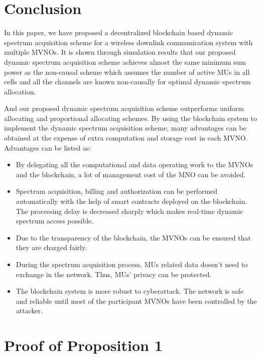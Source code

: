 \documentclass[journal]{IEEEtran}
\begin{document}
\section{Conclusion}
In this paper, we have proposed a decentralized blockchain based dynamic spectrum acquisition scheme for a wireless downlink communication system with multiple MVNOs. It is shown through simulation results that our proposed dynamic spectrum acquisition scheme achieves almost the same minimum sum power as the non-causal scheme which assumes the number of active MUs in all cells and all the channels are known non-causally for optimal dynamic spectrum allocation.{
	\color{red}
	And our proposed dynamic spectrum acquisition scheme outperforms uniform allocating and proportional allocating schemes. By using the blockchain system to implement the dynamic spectrum acquisition scheme, many advantages can be obtained at the expense of extra computation and storage cost in each MVNO. Advantages can be listed as:
	\begin{itemize}
		\item  By delegating all the computational and data operating work to the MVNOs and the blockchain, a lot of management cost of the MNO can be avoided.
		\item Spectrum acquisition, billing and authorization can be performed automatically with the help of smart contracts deployed on the blockchain. The processing delay is decreased sharply which makes real-time dynamic spectrum access possible. 
		\item Due to the transparency of the blockchain, the MVNOs can be ensured that they are charged fairly.
		\item During the spectrum acquisition process, MUs related data doesn't need to exchange in the network. Thus, MUs' privacy can be protected.
		\item The blockchain system is more robust to cyberattack. The network is safe and reliable until most of the participant MVNOs have been controlled by the attacker.
	\end{itemize}
}
\appendices
\section{Proof of Proposition 1}
\end{document}
